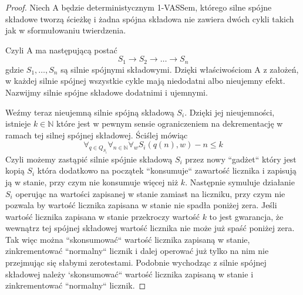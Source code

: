 \documentclass[magisterska]{pracamgr}
\newtheorem{proof}[theorem]{Dowód}
\begin{document}
    \begin{proof}
        Niech A będzie deterministycznym 1-VASSem, którego silne spójne składowe tworzą ścieżkę i żadna spójna składowa
        nie zawiera dwóch cykli takich jak w sformułowaniu twierdzenia.

        Czyli A ma następującą postać
        \[S_1 \rightarrow S_2 \rightarrow \dots \rightarrow S_n     \]
        gdzie $S_1, \dots , S_n$ są silnie spójnymi składowymi.
        Dzięki właściwościom A z założeń, w każdej silnie spójnej wszystkie cykle mają niedodatni albo nieujemny efekt.
        Nazwijmy silnie spójne składowe dodatnimi i ujemnymi.

        Weźmy teraz nieujemną silnie spójną składową $S_i$.
        Dzięki jej nieujemności, istnieje $k \in \mathbb{N}$ które jest w pewnym sensie ograniczeniem na dekrementację w ramach tej silnej spójnej składowej.
        Ściślej mówiąc
        \[\forall_{q \in Q_{S_i}} \forall_{n \in \mathbb{N}} \forall_w S_i(q(n),w) -n \leq k\]
        Czyli możemy zastąpić silnie spójnie składową $S_i$ przez nowy ``gadżet`` który jest kopią $S_i$ która dodatkowo
        na początek ``konsumuje`` zawartość licznika i zapisują ją w stanie, przy czym nie konsumuje więcej niż $k$.
        Następnie symuluje działanie $S_i$ operując na wartości zapisanej w stanie zamiast na liczniku, przy czym nie pozwala
        by wartość licznika zapisana w stanie nie spadła poniżej zera.
        Jeśli wartość licznika zapisana w stanie przekroczy wartość $k$ to jest gwarancja, że wewnątrz tej spójnej składowej
        wartość licznika nie może już spaść poniżej zera.
        Tak więc można ``skonsumować`` wartość licznika zapisaną w stanie, zinkrementować ``normalny`` licznik i dalej operować już tylko na nim
        nie przejmując się słabymi zerotestami.
        Podobnie wychodząc z silnie spójnej składowej należy `skonsumować`` wartość licznika zapisaną w stanie i zinkrementować ``normalny`` licznik.



\end{proof}
\end{document}
